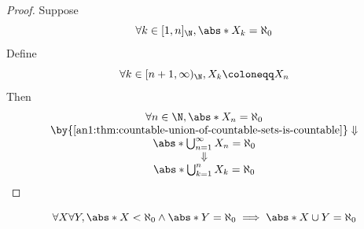 \begin{proof}
  Suppose
  \[
    \forall k \in [1, n]_{\N}, \abs*{X_{k}} = \aleph_{0}
  \]
  Define
  \[
    \forall k \in [n + 1, \infty)_{\N}, X_{k} \coloneqq X_{n}
  \]
  Then
  \[
    \begin{array}{c}
      \forall n \in \N, \abs*{X_{n}} = \aleph_{0}                                   \\
      \by{\Cref{an1:thm:countable-union-of-countable-sets-is-countable}} \Downarrow \\
      \abs*{\bigcup_{n = 1}^{\infty} X_{n}} = \aleph_{0}                            \\
      \Downarrow                                                                    \\
      \abs*{\bigcup_{k = 1}^{n} X_{k}} = \aleph_{0}
    \end{array}
  \]
\end{proof}

\begin{lemma} \label{an1:lem:union-of-finite-set-and-countable-set-is-countable}
  \[
    \forall X \forall Y, \abs*{X} < \aleph_{0} \land \abs*{Y} = \aleph_{0} \implies \abs*{X \cup Y} = \aleph_{0}
  \]
\end{lemma}

